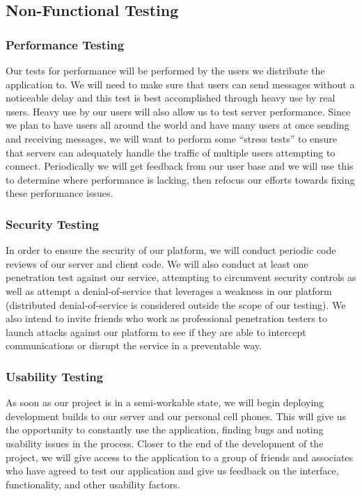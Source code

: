 \documentclass[11pt]{article}
\begin{document}
\subsection{Non-Functional Testing}
\subsubsection*{Performance Testing}
Our tests for performance will be performed by the users we distribute the application to. We will need to make sure that users can send messages without a noticeable delay and this test is best accomplished through heavy use by real users. Heavy use by our users will also allow us to test server performance. Since we plan to have users all around the world and have many users at once sending and receiving messages, we will want to perform some “stress tests” to ensure that servers can adequately handle the traffic of multiple users attempting to connect. Periodically we will get feedback from our user base and we will use this to determine where performance is lacking, then refocus our efforts towards fixing these performance issues.

\subsubsection*{Security Testing}
In order to ensure the security of our platform, we will conduct periodic code reviews of our server and client code. We will also conduct at least one penetration test against our service, attempting to circumvent security controls as well as attempt a denial-of-service that leverages a weakness in our platform (distributed denial-of-service is considered outside the scope of our testing). We also intend to invite friends who work as professional penetration testers to launch attacks against our platform to see if they are able to intercept communications or disrupt the service in a preventable way. 

\subsubsection*{Usability Testing}
As soon as our project is in a semi-workable state, we will begin deploying development builds to our server and our personal cell phones. This will give us the opportunity to constantly use the application, finding bugs and noting usability issues in the process. Closer to the end of the development of the project, we will give access to the application to a group of friends and associates who have agreed to test our application and give us feedback on the interface, functionality, and other usability factors. 
\end{document}
